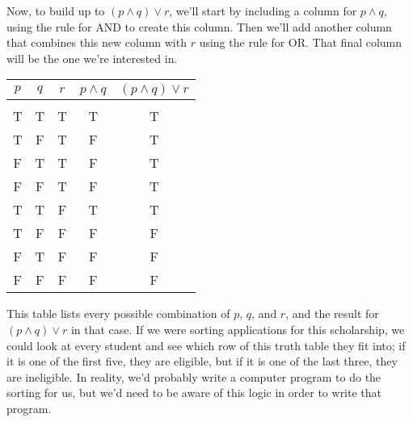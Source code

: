 Now, to build up to $(p \wedge q) \vee r$, we'll start by including a column for $p \wedge q$, using the rule for AND to create this column.  Then we'll add another column that combines this new column with $r$ using the rule for OR.  That final column will be the one we're interested in.
\begin{center}
\begin{tabular}{|c c c c c|}
\hline
$p$ & $q$ & $r$ & $p \wedge q$ & $(p \wedge q) \vee r$\\
\hline
& & & &\\
T & T & T & T & T\\
T & F & T & F & T\\
F & T & T & F & T\\
F & F & T & F & T\\
T & T & F & T & T\\
T & F & F & F & F\\
F & T & F & F & F\\
F & F & F & F & F\\
\hline
\end{tabular}
\end{center}
This table lists every possible combination of $p$, $q$, and $r$, and the result for $(p \wedge q) \vee r$ in that case.  If we were sorting applications for this scholarship, we could look at every student and see which row of this truth table they fit into; if it is one of the first five, they are eligible, but if it is one of the last three, they are ineligible.  In reality, we'd probably write a computer program to do the sorting for us, but we'd need to be aware of this logic in order to write that program.
\pagebreak

